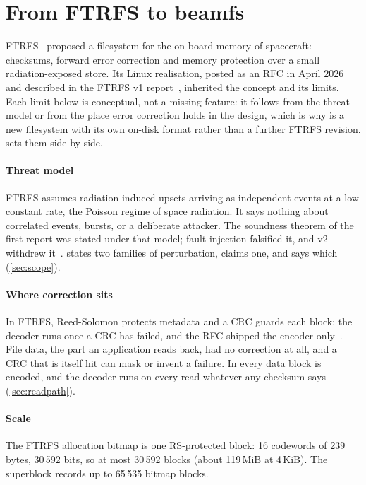\section{From FTRFS to beamfs}\label{sec:ftrfs}

FTRFS~\cite{fuchs2015ftrfs} proposed a filesystem for the on-board
memory of spacecraft: checksums, forward error correction and memory
protection over a small radiation-exposed store. Its Linux realisation,
posted as an RFC in April 2026~\cite{ftrfsrfc} and described in the
FTRFS v1 report~\cite{desbrieres2026ftrfs}, inherited the concept and
its limits. Each limit below is conceptual, not a missing feature: it
follows from the threat model or from the place error correction holds
in the design, which is why \bfs is a new filesystem with its own
on-disk format rather than a further FTRFS revision.
 sets them side by side.

\paragraph*{Threat model}
FTRFS assumes radiation-induced upsets arriving as independent events at
a low constant rate, the Poisson regime of space radiation. It says
nothing about correlated events, bursts, or a deliberate attacker. The
soundness theorem of the first \bfs report was stated under that model;
fault injection falsified it, and v2 withdrew it~\cite{desbrieres2026beamfsv2}.
\bfs states two families of perturbation, claims one, and says which
(\cref{sec:scope}).

\paragraph*{Where correction sits}
In FTRFS, Reed-Solomon protects metadata and a CRC guards each block;
the decoder runs once a CRC has failed, and the RFC shipped the encoder
only~\cite{ftrfsrfc}. File data, the part an application reads back,
had no correction at all, and a CRC that is itself hit can mask or
invent a failure. In \bfs every data block is encoded, and the decoder
runs on every read whatever any checksum says (\cref{sec:readpath}).

\paragraph*{Scale}
The FTRFS allocation bitmap is one RS-protected block: 16 codewords of
239 bytes, 30\,592 bits, so at most 30\,592 blocks (about 119\,MiB at
4\,KiB). The \bfs superblock records up to 65\,535 bitmap blocks.

